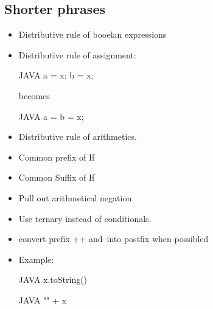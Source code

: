\subsection{Shorter phrases}
\begin{itemize}
  \item Distributive rule of booelan expressions
  \item Distributive rule of assignment: 
  \begin{code}{JAVA}
a = x; 
b = x;   
  \end{code}
  becomes
    \begin{code}{JAVA}
a = b = x;   
  \end{code}
  \item Distributive rule of arithmetics.
  \item Common prefix of If
  \item Common Suffix of If
  \item Pull out arithmetical negation
  \item Use ternary instead of conditionals.
  \item convert prefix ++ and--into postfix when possibled
  \item Example:
\begin{code}{JAVA}
x.toString()
\end{code}
\begin{code}{JAVA}
"" + x
\end{code}
\end{itemize}

